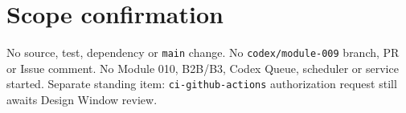 \documentclass[11pt,a4paper]{article}
\begin{document}
\section{Scope confirmation}
No source, test, dependency or \texttt{main} change. No \texttt{codex/module-009} branch, PR or Issue comment. No Module 010, B2B/B3, Codex Queue, scheduler or service started. Separate standing item: \texttt{ci-github-actions} authorization request still awaits Design Window review.
\end{document}
